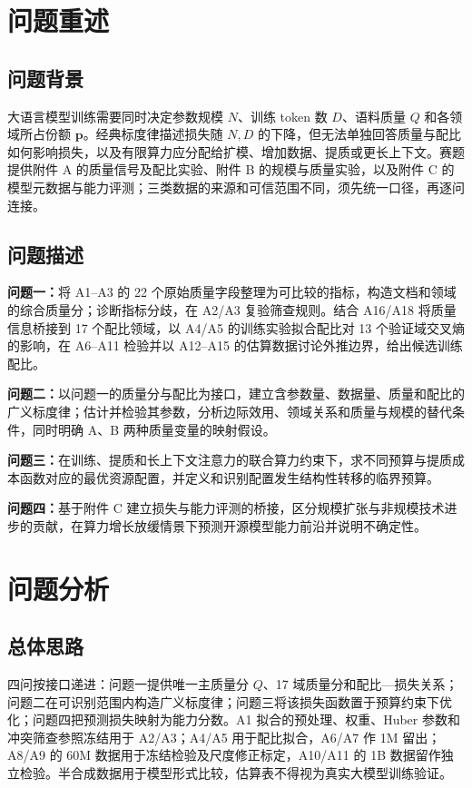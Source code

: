 \section{问题重述}
\subsection{问题背景}
大语言模型训练需要同时决定参数规模 $N$、训练 token 数 $D$、语料质量 $Q$ 和各领域所占份额 $\mathbf p$。经典标度律描述损失随 $N,D$ 的下降，但无法单独回答质量与配比如何影响损失，以及有限算力应分配给扩模、增加数据、提质或更长上下文。赛题提供附件 A 的质量信号及配比实验、附件 B 的规模与质量实验，以及附件 C 的模型元数据与能力评测；三类数据的来源和可信范围不同，须先统一口径，再逐问连接。

\subsection{问题描述}
\textbf{问题一：}将 A1--A3 的 22 个原始质量字段整理为可比较的指标，构造文档和领域的综合质量分；诊断指标分歧，在 A2/A3 复验筛查规则。结合 A16/A18 将质量信息桥接到 17 个配比领域，以 A4/A5 的训练实验拟合配比对 13 个验证域交叉熵的影响，在 A6--A11 检验并以 A12--A15 的估算数据讨论外推边界，给出候选训练配比。

\textbf{问题二：}以问题一的质量分与配比为接口，建立含参数量、数据量、质量和配比的广义标度律；估计并检验其参数，分析边际效用、领域关系和质量与规模的替代条件，同时明确 A、B 两种质量变量的映射假设。

\textbf{问题三：}在训练、提质和长上下文注意力的联合算力约束下，求不同预算与提质成本函数对应的最优资源配置，并定义和识别配置发生结构性转移的临界预算。

\textbf{问题四：}基于附件 C 建立损失与能力评测的桥接，区分规模扩张与非规模技术进步的贡献，在算力增长放缓情景下预测开源模型能力前沿并说明不确定性。

\section{问题分析}
\subsection{总体思路}
四问按接口递进：问题一提供唯一主质量分 $Q$、17 域质量分和配比—损失关系；问题二在可识别范围内构造广义标度律；问题三将该损失函数置于预算约束下优化；问题四把预测损失映射为能力分数。A1 拟合的预处理、权重、Huber 参数和冲突筛查参照冻结用于 A2/A3；A4/A5 用于配比拟合，A6/A7 作 1M 留出；A8/A9 的 60M 数据用于冻结检验及尺度修正标定，A10/A11 的 1B 数据留作独立检验。半合成数据用于模型形式比较，估算表不得视为真实大模型训练验证。

